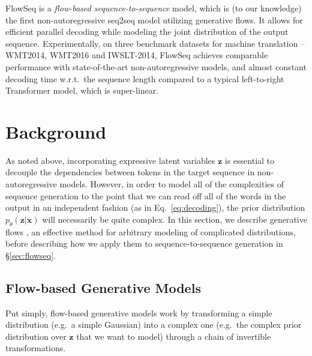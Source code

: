 \documentclass[11pt,a4paper]{article}
\newcommand{\zv}{\mathbf{z}}
\begin{document}
FlowSeq is a \emph{flow-based sequence-to-sequence} model, which is (to our knowledge) the first non-autoregressive seq2seq model utilizing generative flows.
It allows for efficient parallel decoding while modeling the joint distribution of the output sequence.
Experimentally, on three benchmark datasets for machine translation -- WMT2014, WMT2016 and IWSLT-2014, 
FlowSeq achieves comparable performance with state-of-the-art non-autoregressive models, and almost constant decoding time w.r.t.~the sequence length compared to a typical left-to-right Transformer model, which is super-linear.

\section{Background}
As noted above, incorporating expressive latent variables $\zv$ is essential to decouple the dependencies between tokens in the target sequence in non-autoregressive models.
However, in order to model all of the complexities of sequence generation to the point that we can read off all of the words in the output in an independent fashion (as in Eq.~\eqref{eq:decoding}), the prior distribution $p_{\theta}(\zv|\mathbf{x})$ will necessarily be quite complex.
In this section, we describe generative flows \cite{rezende2015variational}, an effective method for arbitrary modeling of complicated distributions, before describing how we apply them to sequence-to-sequence generation in \S\ref{sec:flowseq}.

\subsection{Flow-based Generative Models}
\label{subsec:flow}
Put simply, flow-based generative models work by transforming a simple distribution (e.g.~a simple Gaussian) into a complex one (e.g.~the complex prior distribution over $\zv$ that we want to model) through a chain of invertible transformations.
\end{document}
